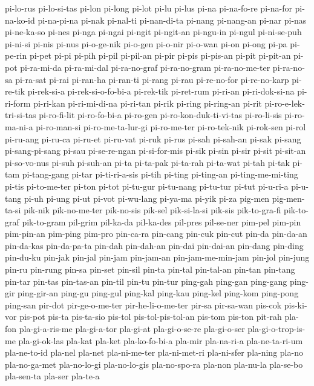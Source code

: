 {pi-lo-rus pi-lo-si-tas pi-lon pi-long pi-lot pi-lu pi-lus pi-na
pi-na-fo-re pi-na-for pi-na-ko-id pi-na-pi-na pi-nak pi-nal-ti
pi-nan-di-ta pi-nang pi-nang-an pi-nar pi-nas pi-ne-ka-so pi-nes pi-nga
pi-ngai pi-ngit pi-ngit-an pi-ngu-in pi-ngul pi-ni-se-puh pi-ni-si pi-nis
pi-nus pi-o-ge-nik pi-o-gen pi-o-nir pi-o-wan pi-on pi-ong pi-pa pi-pe-rin
pi-pet pi-pi pi-pih pi-pil pi-pil-an pi-pir pi-pis pi-pis-an pi-pit
pi-pit-an pi-pot pi-ra-mi-da pi-ra-mi-dal pi-ra-no-graf pi-ra-no-gram
pi-ra-no-me-ter pi-ra-no-sa pi-ra-sat pi-rai pi-ran-ha pi-ran-ti pi-rang
pi-rau pi-re-no-for pi-re-no-karp pi-re-tik pi-rek-si-a
pi-rek-si-o-fo-bi-a pi-rek-tik pi-ret-rum pi-ri-an pi-ri-dok-si-na
pi-ri-form pi-ri-kan pi-ri-mi-di-na pi-ri-tan pi-rik pi-ring pi-ring-an
pi-rit pi-ro-e-lek-tri-si-tas pi-ro-fi-lit pi-ro-fo-bi-a pi-ro-gen
pi-ro-kon-duk-ti-vi-tas pi-ro-li-sis pi-ro-ma-ni-a pi-ro-man-si
pi-ro-me-ta-lur-gi pi-ro-me-ter pi-ro-tek-nik pi-rok-sen pi-rol pi-ru-ang
pi-ru-ca pi-ru-et pi-ru-vat pi-ruk pi-rus pi-sah pi-sah-an pi-sak pi-sang
pi-sang-pi-sang pi-sau pi-se-re-ngan pi-si-for-mis pi-sik pi-sin pi-sir
pi-sit pi-sit-an pi-so-vo-nus pi-suh pi-suh-an pi-ta pi-ta-pak pi-ta-rah
pi-ta-wat pi-tah pi-tak pi-tam pi-tang-gang pi-tar pi-ti-ri-a-sis pi-tih
pi-ting pi-ting-an pi-ting-me-mi-ting pi-tis pi-to-me-ter pi-ton pi-tot
pi-tu-gur pi-tu-nang pi-tu-tur pi-tut pi-u-ri-a pi-u-tang pi-uh pi-ung
pi-ut pi-vot pi-wu-lang pi-ya-ma pi-yik pi-za pig-men pig-men-ta-si
pik-nik pik-no-me-ter pik-no-sis pik-sel pik-si-la-si pik-sis
pik-to-gra-fi pik-to-graf pik-to-gram pil-grim pil-ka-da pil-ka-des
pil-pres pil-se-ner pim-pel pim-pin pim-pin-an pim-ping pim-pro pin-ca-ra
pin-cang pin-cuk pin-cut pin-da pin-da-an pin-da-kas pin-da-pa-ta pin-dah
pin-dah-an pin-dai pin-dai-an pin-dang pin-ding pin-du-ku pin-jak pin-jal
pin-jam pin-jam-an pin-jam-me-min-jam pin-jol pin-jung pin-ru pin-rung
pin-sa pin-set pin-sil pin-ta pin-tal pin-tal-an pin-tan pin-tang pin-tar
pin-tas pin-tas-an pin-til pin-tu pin-tur ping-gah ping-gan ping-gang
ping-gir ping-gir-an ping-gu ping-gul ping-kal ping-kau ping-kel ping-kom
ping-pong ping-san pir-dot pir-ge-o-me-ter pir-he-li-o-me-ter pir-sa
pir-sa-wan pis-cok pis-ki-vor pis-pot pis-ta pis-ta-sio pis-tol
pis-tol-pis-tol-an pis-tom pis-ton pit-rah pla-fon pla-gi-a-ris-me
pla-gi-a-tor pla-gi-at pla-gi-o-se-re pla-gi-o-ser pla-gi-o-trop-is-me
pla-gi-ok-las pla-kat pla-ket pla-ko-fo-bi-a pla-mir pla-na-ri-a
pla-ne-ta-ri-um pla-ne-to-id pla-nel pla-net pla-ni-me-ter pla-ni-met-ri
pla-ni-sfer pla-ning pla-no pla-no-ga-met pla-no-lo-gi pla-no-lo-gis
pla-no-spo-ra pla-non pla-nu-la pla-se-bo pla-sen-ta pla-ser pla-te-a
}
